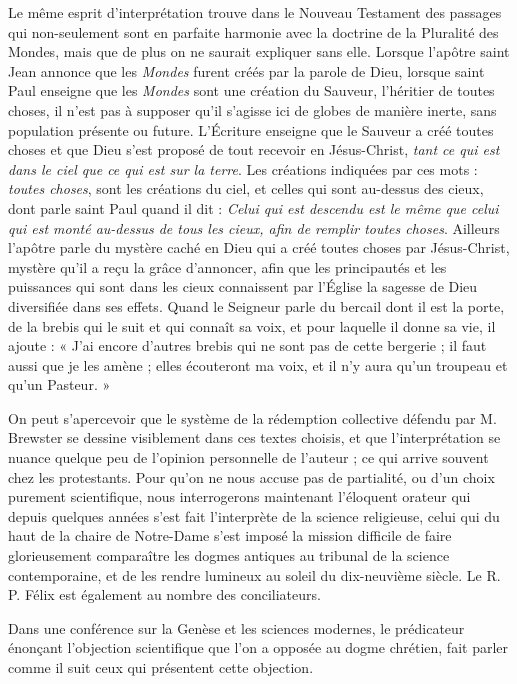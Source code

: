 \documentclass[a4paper, 11pt, oneside, landscape]{article}
\begin{document}
Le même esprit d'interprétation trouve dans le Nouveau Testament des passages qui non-seulement sont en parfaite harmonie avec la doctrine de la Pluralité des Mondes, mais que de plus on ne saurait expliquer sans elle. Lorsque l'apôtre saint Jean annonce que les \emph{Mondes} furent créés par la parole de Dieu, lorsque saint Paul enseigne que les \emph{Mondes} sont une création du Sauveur, l'héritier de toutes choses, il n'est pas à supposer qu'il s'agisse ici de globes de manière inerte, sans population présente ou future. L'Écriture enseigne que le Sauveur a créé toutes choses et que Dieu s'est proposé de tout recevoir en Jésus-Christ, \emph{tant ce qui est dans le ciel que ce qui est sur la terre}. Les créations indiquées par ces mots : \emph{toutes choses}, sont les créations du ciel, et celles qui sont au-dessus des cieux, dont parle saint Paul quand il dit : \emph{Celui qui est descendu est le même que celui qui est monté au-dessus de tous les cieux, afin de remplir toutes choses}. Ailleurs l'apôtre parle du mystère caché en Dieu qui a créé toutes choses par Jésus-Christ, mystère qu'il a reçu la grâce d'annoncer, afin que les principautés et les puissances qui sont dans les cieux connaissent par l'Église la sagesse de Dieu diversifiée dans ses effets. Quand le Seigneur parle du bercail dont il est la porte, de la brebis qui le suit et qui connaît sa voix, et pour laquelle il donne sa vie, il ajoute : « J'ai encore d'autres brebis qui ne sont pas de cette bergerie ; il faut aussi que je les amène ; elles écouteront ma voix, et il n'y aura qu'un troupeau et qu'un Pasteur. »

On peut s'apercevoir que le système de la rédemption collective défendu par M. Brewster se dessine visiblement dans ces textes choisis, et que l'interprétation se nuance quelque peu de l'opinion personnelle de l'auteur ; ce qui arrive souvent chez les protestants. Pour qu'on ne nous accuse pas de partialité, ou d'un choix purement scientifique, nous interrogerons maintenant l'éloquent orateur qui depuis quelques années s'est fait l'interprète de la science religieuse, celui qui du haut de la chaire de Notre-Dame s'est imposé la mission difficile de faire glorieusement comparaître les dogmes antiques au tribunal de la science contemporaine, et de les rendre lumineux au soleil du dix-neuvième siècle. Le R. P. Félix est également au nombre des conciliateurs.

Dans une conférence sur la Genèse et les sciences modernes, le prédicateur énonçant l'objection scientifique que l'on a opposée au dogme chrétien, fait parler comme il suit ceux qui présentent cette objection.
\end{document}
